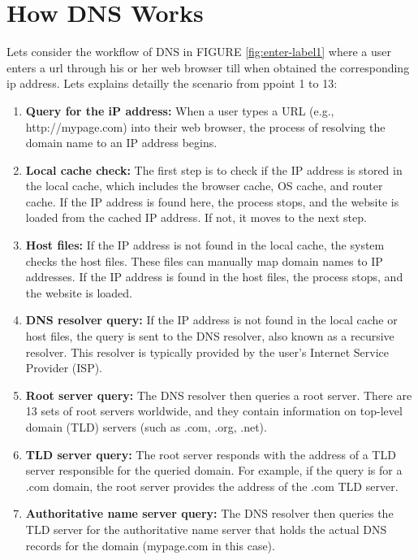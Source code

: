 \section*{How DNS Works}
Lets consider the workflow of DNS in  FIGURE \ref{fig:enter-label1} where a user enters a url through his or her web browser till when obtained the corresponding ip address. Lets explains detailly the scenario from ppoint 1 to 13: 
\begin{enumerate}
	\item \textbf{Query for the iP address:} When a user types a URL (e.g., http://mypage.com) into their web browser, the process of resolving the domain name to an IP address begins.
	
	\item \textbf{Local cache check:} The first step is to check if the IP address is stored in the local cache, which includes the browser cache, OS cache, and router cache. If the IP address is found here, the process stops, and the website is loaded from the cached IP address. If not, it moves to the next step.
	
	\item \textbf{Host files:} If the IP address is not found in the local cache, the system checks the host files. These files can manually map domain names to IP addresses. If the IP address is found in the host files, the process stops, and the website is loaded.
	
	\item \textbf{DNS resolver query:} If the IP address is not found in the local cache or host files, the query is sent to the DNS resolver, also known as a recursive resolver. This resolver is typically provided by the user's Internet Service Provider (ISP).
	
	\item \textbf{Root server query:} The DNS resolver then queries a root server. There are 13 sets of root servers worldwide, and they contain information on top-level domain (TLD) servers (such as .com, .org, .net).
	
	\item \textbf{TLD server query:} The root server responds with the address of a TLD server responsible for the queried domain. For example, if the query is for a .com domain, the root server provides the address of the .com TLD server.
	
	\item \textbf{Authoritative name server query:} The DNS resolver then queries the TLD server for the authoritative name server that holds the actual DNS records for the domain (mypage.com in this case).
	

\end{enumerate}
